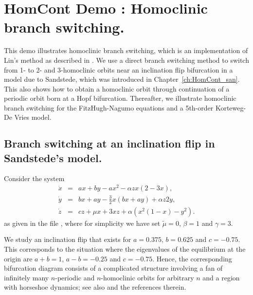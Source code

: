 

\chapter{ {\cal HomCont} Demo : Homoclinic branch switching.} \label{ch:HomCont_hbs}


This demo illustrates homoclinic branch switching, which is an
implementation of Lin's method \cite{Li:90,Sa:93,Ye:01}
as described in . We use a
direct branch switching method to switch from 1- to 2- and
3-homoclinic orbits near an inclination flip bifurcation 
in a model due to Sandstede, 
which was introduced in Chapter~\ref{ch:HomCont_san}.
This also shows how to obtain a homoclinic orbit through continuation
of a periodic orbit born at a Hopf bifurcation.
Thereafter, we illustrate homoclinic branch switching for the
FitzHugh-Nagumo equations and a 5th-order Korteweg-De Vries model.

\section{ Branch switching at an inclination flip in Sand\-stede's
  model.}
\label{sec:HomCont_hbs_san}
Consider the system \cite{Sa:95b}
\begin{equation} \begin{array}{rcl}
\dot{x} & = & a x + b y - a x^2 - \alpha z x (2-3x), \\
\dot{y} & = & b x + a y - \frac{3}{2} x (b x + a y) + \alpha z 2 y, \\
\dot{z} & = & c z + \mu x + 3 x z + \alpha (x^2 (1-x) - y^2).
\end{array} \end{equation}
as given in the file , where for simplicity we have
set $\tilde\mu=0$, $\beta=1$ and $\gamma=3$.

We study an inclination flip that exists for $a=0.375$,
$b=0.625$ and $c=-0.75$. This corresponds to the situation
where the eigenvalues of the equilibrium at the origin are
$a+b=1$, $a-b=-0.25$ and $c=-0.75$. Hence, the corresponding
bifurcation diagram consists of a complicated structure involving a
fan of infinitely many $n$-periodic and $n$-homoclinic orbits
for arbitrary $n$ and a region with horseshoe dynamics; see
also  and the references therein.

